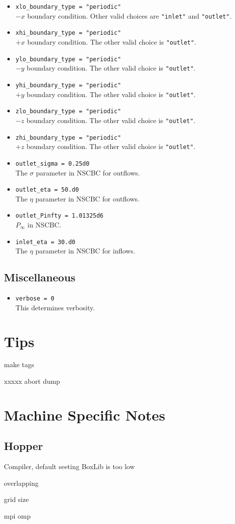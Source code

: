 \documentclass[11pt,letterpaper]{article}
\begin{document}
\begin{itemize}
\item {\tt xlo\_boundary\_type = "periodic"}\\
  $-x$ boundary condition.  Other valid choices are {\tt "inlet"} and
  {\tt "outlet"}. 
\item {\tt xhi\_boundary\_type = "periodic"}\\
  $+x$ boundary condition.  The other valid choice is {\tt "outlet"}.
\item {\tt ylo\_boundary\_type = "periodic"}\\
  $-y$ boundary condition.  The other valid choice is {\tt "outlet"}.
\item {\tt yhi\_boundary\_type = "periodic"}\\
  $+y$ boundary condition.  The other valid choice is {\tt "outlet"}.
\item {\tt zlo\_boundary\_type = "periodic"}\\
  $-z$ boundary condition.  The other valid choice is {\tt "outlet"}.
\item {\tt zhi\_boundary\_type = "periodic"}\\
  $+z$ boundary condition.  The other valid choice is {\tt "outlet"}.
\item {\tt outlet\_sigma = 0.25d0}\\
  The $\sigma$ parameter in NSCBC for outflows.
\item {\tt outlet\_eta = 50.d0}\\
  The $\eta$ parameter in NSCBC for outflows.
\item {\tt outlet\_Pinfty = 1.01325d6}\\
  $P_\infty$ in NSCBC.
\item {\tt inlet\_eta = 30.d0}\\
  The $\eta$ parameter in NSCBC for inflows.
\end{itemize}

\subsection{Miscellaneous}

\begin{itemize}
\item {\tt verbose = 0}\\
  This determines verbosity.
\end{itemize}

\section{Tips}

make tags

xxxxx abort dump 

\section{Machine Specific Notes}

\subsection{Hopper}

Compiler, default seeting BoxLib is too low

overlapping

grid size

mpi omp 
\end{document}
